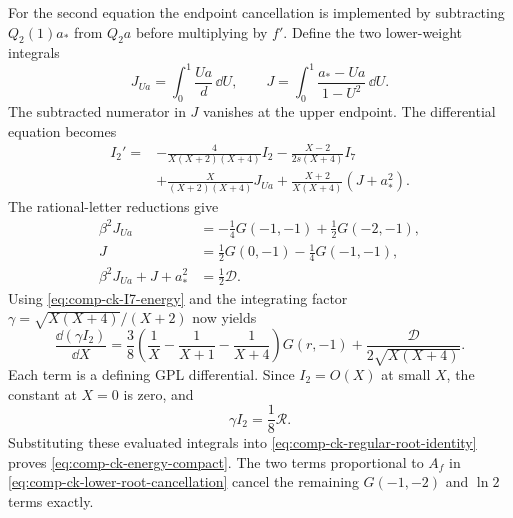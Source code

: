 For the second equation the endpoint cancellation is implemented by
subtracting $Q_2(1)a_*$ from $Q_2a$ before multiplying by $f'$.
Define the two lower-weight integrals
\begin{equation}
 J_{Ua}=\int_0^1\frac{Ua}{d}\,\dd U,\qquad
 J=\int_0^1\frac{a_*-Ua}{1-U^2}\,\dd U.
\end{equation}
The subtracted numerator in $J$ vanishes at the upper endpoint.
The differential equation becomes
\begin{equation}
\begin{aligned}
 I_2'={}&-\frac4{X(X+2)(X+4)}I_2
 -\frac{X-2}{2s(X+4)}I_7\\
 &+\frac X{(X+2)(X+4)}J_{Ua}
 +\frac{X+2}{X(X+4)}(J+a_*^2).
\end{aligned}
\end{equation}
The rational-letter reductions give
\begin{align}
 \beta^2J_{Ua}&=-\tfrac14G(-1,-1)+\tfrac12G(-2,-1),\\
 J&=\tfrac12G(0,-1)-\tfrac14G(-1,-1),\\
 \beta^2J_{Ua}+J+a_*^2&=\tfrac12\mathcal D.
\end{align}
Using \eqref{eq:comp-ck-I7-energy} and the integrating factor
$\gamma=\sqrt{X(X+4)}/(X+2)$ now yields
\begin{equation}
 \frac{\dd(\gamma I_2)}{\dd X}
 =\frac38\left(\frac1X-\frac1{X+1}-\frac1{X+4}\right)G(r,-1)
       +\frac{\mathcal D}{2\sqrt{X(X+4)}}.
\end{equation}
Each term is a defining GPL differential. Since $I_2=O(X)$ at small
$X$, the constant at $X=0$ is zero, and
\begin{equation}
 \gamma I_2=\frac18\mathcal R.
 \label{eq:comp-ck-I2-energy}
\end{equation}
Substituting these evaluated integrals into
\eqref{eq:comp-ck-regular-root-identity} proves
\eqref{eq:comp-ck-energy-compact}. The two terms proportional to
$A_f$ in \eqref{eq:comp-ck-lower-root-cancellation} cancel the
remaining $G(-1,-2)$ and $\ln2$ terms exactly.
